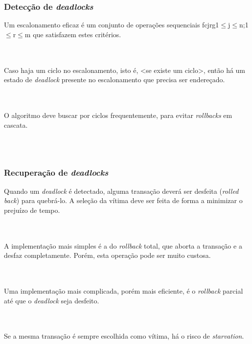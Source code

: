 \documentclass{beamer}
\begin{document}

\begin{frame}
    \frametitle{Detecção de \emph{deadlocks}}

    Um escalonamento eficaz é um conjunto de operações sequenciais fcjrg1$\leq$j$\leq$n;1$\leq$r$\leq$m que satisfazem estes critérios.

    \\~\\
    Caso haja um ciclo no escalonamento, isto é, <se existe um ciclo>, então há um estado de \emph{deadlock} presente no escalonamento que precisa ser endereçado.

    \\~\\
    O algoritmo deve buscar por ciclos frequentemente, para evitar \emph{rollbacks} em cascata.

    \\~\\
\end{frame}



\begin{frame}
    \frametitle{Recuperação de \emph{deadlocks}}

    Quando um \emph{deadlock} é detectado, alguma transação deverá ser desfeita (\emph{rolled back}) para quebrá-lo. A seleção da vítima deve ser feita de forma a minimizar o prejuízo de tempo.

    \\~\\
    A implementação mais simples é a do \emph{rollback} total, que aborta a transação e a desfaz completamente. Porém, esta operação pode ser muito custosa.

    \\~\\
    Uma implementação mais complicada, porém mais eficiente, é o \emph{rollback} parcial até que o \emph{deadlock} seja desfeito.

    \\~\\
    Se a mesma transação é sempre escolhida como vítima, há o risco de \emph{starvation}.

\end{frame}
\end{document}
